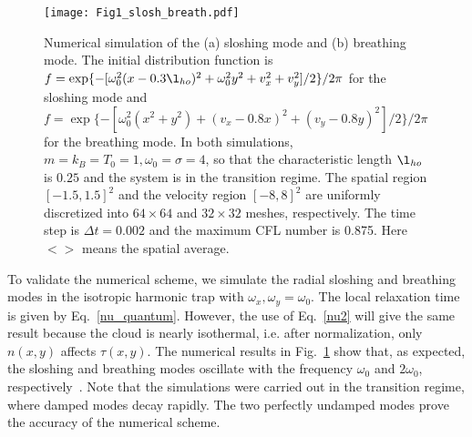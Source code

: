%



\begin{figure}[t]
	\center
	\texttt{[image: Fig1\_slosh\_breath.pdf]}
	\caption[Numerical simulation of the (a) sloshing mode and (b) breathing mode.]{Numerical simulation of the (a) sloshing mode and (b) breathing mode. The initial distribution function is $f=\exp\{-[\omega_0^2(x-0.3\l_{ho})^2+\omega_0^2y^2+v_x^2+v_y^2]/2\}/2\pi$ for the sloshing mode and $f=\exp\{-[\omega_0^2(x^2+y^2)+(v_x-0.8x)^2+(v_y-0.8y)^2]/2\}/2\pi$ for the breathing mode. In both simulations, $m=k_B=T_0=1, \omega_0=\sigma=4$, so that the characteristic length $\l_{ho}$ is $0.25$ and the system is in the transition regime. The spatial region $[-1.5,1.5]^2$ and the velocity region $[-8,8]^2$ are uniformly discretized into $64\times64$ and $32\times32$ meshes, respectively. The time step is $\Delta t=0.002$ and the maximum CFL number is 0.875. Here $<>$ means the spatial average. }
	\label{fig.1}
\end{figure}



To validate the numerical scheme, we simulate the radial sloshing and breathing modes in the isotropic harmonic trap with $\omega_x,\omega_y=\omega_0$. The local relaxation time is given by Eq.~\eqref{nu_quantum}. However, the use of Eq.~\eqref{nu2} will give the same result because the cloud is nearly isothermal, i.e. after normalization, only $n(x,y)$ affects $\tau(x,y)$.  The numerical results in Fig.~\ref{fig.1} show that, as expected, the sloshing and breathing modes oscillate with the frequency $\omega_0$ and $2\omega_0$, respectively~\cite{Guery-Odelin1999, Lepers2010}. Note that the simulations were carried out in the transition regime, where damped modes decay rapidly. The two perfectly undamped modes prove the accuracy of the numerical scheme.



